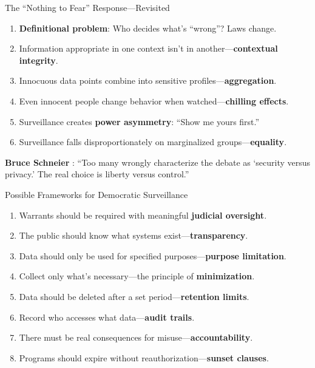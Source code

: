 ﻿\documentclass[aspectratio=169,11pt]{beamer}
\begin{document}
\begin{frame}{The ``Nothing to Fear'' Response---Revisited}
\begin{objectionbox}
\small
\begin{enumerate}
    \item \textbf{Definitional problem}: Who decides what's ``wrong''? Laws change.
    \item Information appropriate in one context isn't in another---\textbf{contextual integrity}.
    \item Innocuous data points combine into sensitive profiles---\textbf{aggregation}.
    \item Even innocent people change behavior when watched---\textbf{chilling effects}.
    \item Surveillance creates \textbf{power asymmetry}: ``Show me yours first.''
    \item Surveillance falls disproportionately on marginalized groups---\textbf{equality}.
\end{enumerate}
\end{objectionbox}

\vspace{0.1em}
\textbf{Bruce Schneier} \parencite{schneier_data_goliath}: ``Too many wrongly characterize the debate as `security versus privacy.' The real choice is liberty versus control.''
\end{frame}

\begin{frame}{Possible Frameworks for Democratic Surveillance}
\begin{conceptbox}
\small
\begin{enumerate}
    \item Warrants should be required with meaningful \textbf{judicial oversight}.
    \item The public should know what systems exist---\textbf{transparency}.
    \item Data should only be used for specified purposes---\textbf{purpose limitation}.
    \item Collect only what's necessary---the principle of \textbf{minimization}.
    \item Data should be deleted after a set period---\textbf{retention limits}.
    \item Record who accesses what data---\textbf{audit trails}.
    \item There must be real consequences for misuse---\textbf{accountability}.
    \item Programs should expire without reauthorization---\textbf{sunset clauses}.
\end{enumerate}
\end{conceptbox}
\end{frame}
\end{document}

